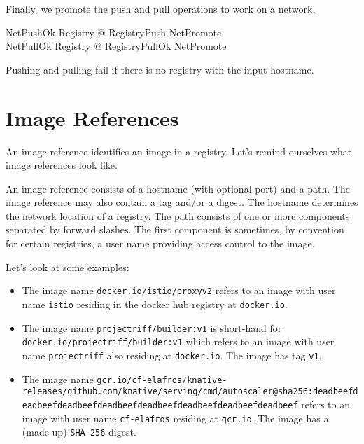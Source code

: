\documentclass[a4paper,twoside,12pt]{article}
\begin{document}
Finally, we promote the push and pull operations to work on a network.
\begin{zed}
  NetPushOk  \exists \Delta Registry @ RegistryPush \land NetPromote \\
  NetPullOk  \exists \Delta Registry @ RegistryPullOk \land NetPromote
\end{zed}
Pushing and pulling fail if there is no registry with the input hostname.

\newpage
\section{Image References}

An image reference identifies an image in a registry. Let's remind ourselves what image references look like.

An image reference consists of a hostname (with optional port) and a path. The image reference may also contain a tag and/or a digest. The hostname determines the network location of a registry. The path consists of one or more components separated by forward slashes. The first component is sometimes, by convention for certain registries, a user name providing access control to the image.

Let's look at some examples:
\begin{itemize}
\item The image name \texttt{docker.io/istio/proxyv2} refers to an image with user name \texttt{istio} residing in the docker hub registry at \texttt{docker.io}.

\item The image name \texttt{projectriff/builder:v1} is short-hand for\linebreak
\texttt{docker.io/projectriff/builder:v1} which refers to an image with user name \texttt{projectriff} also residing at \texttt{docker.io}. The image has tag \texttt{v1}.

\item The image name \texttt{gcr.io/cf-elafros/knative-releases/github.com}\linebreak\texttt{/knative/serving/cmd/autoscaler@sha256:deadbeefdeadbeef}\linebreak\texttt{deadbeefdeadbeefdeadbeefdeadbeefdeadbeefdeadbeef} refers to an image with user name \texttt{cf-elafros} residing at \texttt{gcr.io}. The image has a (made up) \texttt{SHA-256} digest.
\end{itemize}
\end{document}
